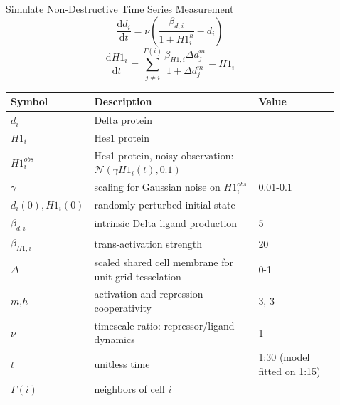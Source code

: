 \documentclass[xelatex]{beamer}
\newlength{\sepwidth}
\newlength{\colwidth}
\newcommand{\separatorcolumn}{\begin{column}{\sepwidth}\end{column}}
\begin{document}
\begin{frame}[t]
\begin{columns}[t]
\begin{column}{\colwidth}
  \begin{alertblock}{Simulate Non-Destructive Time Series Measurement}
  	\begin{equation}\label{eq:delta}
  	\frac{\mathrm d d_i}{\mathrm dt} =
  	\nu \left(
  	\frac{\beta_{d,i}}{1 + \textit{H1}_i^h}
  	- d_i \right)
  	\end{equation}
  	\begin{equation}\label{eq:H1}
  	\frac{\mathrm d \textit{H1}_i}{\mathrm dt} =
  	\sum_{j \neq i}^{\Gamma(i)} \frac{\beta_{\textit{H1},i} \Delta d_j^m}{1 + \Delta d_j^m} - \textit{H1}_i
  	\end{equation}
  	\centering
  	\begin{tabular}{lll}
  		\toprule
  		Symbol & Description & Value \\
  		\midrule
  		$d_i$ & Delta protein &\\
  		$\textit{H1}_i$ & Hes1 protein &\\
  		$\textit{H1}^{obs}_i$ & Hes1 protein, noisy observation: $\mathcal{N}\left(\gamma \textit{H1}_i(t),0.1 \right)$ &\\
  		$\gamma$ & scaling for Gaussian noise on $\textit{H1}^{obs}_i$ & 0.01-0.1\\
  		$d_i(0), \textit{H1}_i(0)$ & randomly perturbed initial state & \\
  		$\beta_{d,i}$ & intrinsic Delta ligand production & 5\\
  		$\beta_{\textit{H1},i}$ & trans-activation strength & 20 \\
  		$\Delta$ & scaled shared cell membrane for unit grid tesselation & 0-1 \\
  		$m$,$h$ & activation and repression cooperativity & 3, 3\\
  		$\nu$ & timescale ratio: repressor/ligand dynamics & 1\\
  		$t$ & unitless time & 1:30 (model fitted on 1:15)\\
  		$\Gamma(i)$ & neighbors of cell $i$ &\\
  		\bottomrule
  	\end{tabular}
  	\normalsize
  \end{alertblock}

\end{column}

\separatorcolumn

\begin{column}{\colwidth}


\end{column}
\end{columns}
\end{frame}
\end{document}
